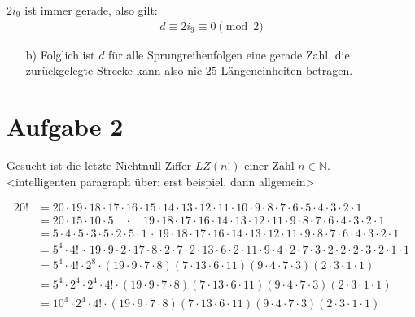 \documentclass[12pt,a4paper,oneside]{article}
\DeclarePairedDelimiter{\floor}{\lfloor}{\rfloor}
\begin{document}
$2 i_9$ ist immer gerade, also gilt:
\begin{align*}
	d \equiv 2 i_9 \equiv 0 \pmod 2
\end{align*}

\begin{itemize}
	\item[b)] Folglich ist $d$ für alle Sprungreihenfolgen eine gerade Zahl, die zurückgelegte Strecke kann also nie $25$ Längeneinheiten betragen.
\end{itemize}

\pagebreak
\section[]{Aufgabe 2}
Gesucht ist die letzte Nichtnull-Ziffer $LZ(n!)$ einer Zahl $n \in \mathbb{N}$. \\
<intelligenten paragraph über: erst beispiel, dann allgemein>

\begin{equation*}
	\begin{split}
		20! &= 20\cdot19\cdot18\cdot17\cdot16\cdot15\cdot14\cdot13\cdot12\cdot11\cdot10\cdot9\cdot8\cdot7\cdot6\cdot5\cdot4\cdot3\cdot2\cdot1 \\
		&= 20\cdot15\cdot10\cdot5 \quad\cdot\quad 19\cdot18\cdot17\cdot16\cdot14\cdot13\cdot12\cdot11\cdot9\cdot8\cdot7\cdot6\cdot4\cdot3\cdot2\cdot1 \\
		&= 5\cdot4 \cdot 5\cdot3 \cdot 5\cdot2 \cdot 5\cdot1 \,\cdot\, 19\cdot18\cdot17\cdot16\cdot14\cdot13\cdot12\cdot11\cdot9\cdot8\cdot7\cdot6\cdot4\cdot3\cdot2\cdot1 \\
		&= 5^4 \cdot 4! \,\cdot\, 19\cdot9\cdot2\cdot17\cdot8\cdot2\cdot7\cdot2\cdot13\cdot6\cdot2\cdot11\cdot9\cdot4\cdot2\cdot7\cdot3\cdot2\cdot2\cdot2\cdot3\cdot2\cdot1\cdot1 \\
		&= 5^4 \cdot 4! \cdot 2^8 \cdot (19\cdot9\cdot7\cdot8)(7\cdot13\cdot6\cdot11)(9\cdot4\cdot7\cdot3)(2\cdot3\cdot1\cdot1) \\
		&= 5^4 \cdot 2^4 \cdot 2^4 \cdot 4! \cdot (19\cdot9\cdot7\cdot8)(7\cdot13\cdot6\cdot11)(9\cdot4\cdot7\cdot3)(2\cdot3\cdot1\cdot1) \\
		&= 10^4 \cdot 2^4 \cdot 4! \cdot (19\cdot9\cdot7\cdot8)(7\cdot13\cdot6\cdot11)(9\cdot4\cdot7\cdot3)(2\cdot3\cdot1\cdot1) \\
	\end{split}
\end{equation*}
\end{document}

